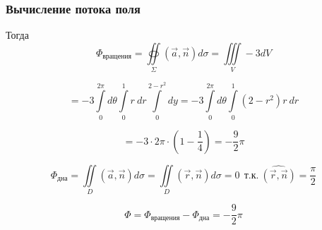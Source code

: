 \begin{frame}\frametitle{Вычисление потока поля} 

Тогда
  \begin{equation*}
    \Phi_{\text{вращения}} = \oiint\limits_{\Sigma}\left( \vec {a}, \vec {n} \right) d\sigma = \iiint\limits_V -3 dV
  \end{equation*}
  
  \begin{equation*}
    = -3 \int\limits_{0}^{2 \pi} d \theta
    \int\limits_{0}^{1} r~dr 
    \int\limits_{0}^{2-r^2} dy 
    = -3 \int\limits_{0}^{2 \pi} d \theta
    \int\limits_{0}^{1} (2-r^2)r~dr 
  \end{equation*}
 
  \begin{equation*}
    = -3 \cdot 2 \pi \cdot
    (1 - \frac{1}{4})
    = - \frac{9}{2}\pi
  \end{equation*}

  \begin{equation*}
    \Phi_{\text{дна}} = \iint\limits_{D}(\vec{a},\vec{n})d\sigma =  \iint\limits_{D}(\vec{r},\vec{n})d\sigma = 0 ~~ \text{т.к.} ~ \widehat{(\vec{r}, \vec{n})} = \frac{\pi}{2}
  \end{equation*}

  \begin{equation*}
    \Phi = \Phi_{\text{вращения}} - \Phi_{\text{дна}} = -\frac{9}{2}\pi
  \end{equation*}
\end{frame}
